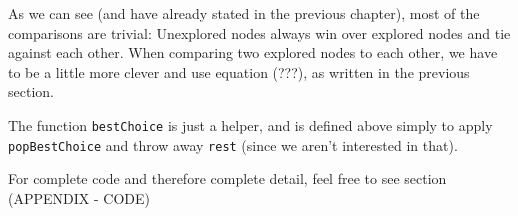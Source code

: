 As we can see (and have already stated in the previous chapter), most of the comparisons are trivial: Unexplored nodes always win over explored nodes and tie against each other.
When comparing two explored nodes to each other, we have to be a little more clever and use equation (???), as written in the previous section.

The function \texttt{bestChoice} is just a helper, and is defined above simply to apply \texttt{popBestChoice} and throw away \texttt{rest} (since we aren't interested in that).



For complete code and therefore complete detail, feel free to see section (APPENDIX - CODE)
